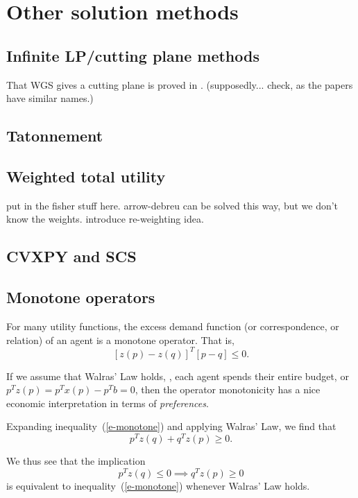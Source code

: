 \documentclass[12pt]{article}
\begin{document}
\section{Other solution methods}

\subsection{Infinite LP/cutting plane methods}
That WGS gives a cutting plane is proved in \cite{arrow1959stability}.
(supposedly... check, as the papers have similar names.)

\subsection{Tatonnement}

\subsection{Weighted total utility}
put in the fisher stuff here. arrow-debreu can be solved this way, but we
don't know the weights. introduce re-weighting idea.

\subsection{CVXPY and SCS}

\subsection{Monotone operators}
For many utility functions,
the excess demand function
(or correspondence,
or relation) of an agent is a
monotone operator.
That is,
\begin{equation}
\label{e-monotone}
\left[z(p) - z(q) \right]^T \left[p - q\right] \leq 0.
\end{equation}

If we assume that Walras' Law holds, \ie, each agent spends their entire
budget, or $p^T z(p) = p^T x(p) - p^T b = 0$, then the operator monotonicity has
a nice economic interpretation in terms of \emph{preferences}.

Expanding inequality~(\ref{e-monotone}) and applying Walras' Law, we find that
\[
p^T z(q) + q^T z(p) \geq 0.
\]

We thus see that the implication
\begin{equation}
\label{e-preference}
p^T z(q) \leq 0 \implies q^T z(p) \geq 0
\end{equation}
is equivalent
to inequality~(\ref{e-monotone}) whenever Walras' Law holds.
\end{document}
